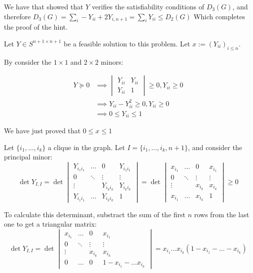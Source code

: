 \documentclass[11pt]{article}
\begin{document}
We have that showed that \(Y\) verifies the satisfiability conditions of \(D_3(G)\), and therefore \(D_3(G) = \sum_{i} -Y_{ii} + 2Y_{i,n+1} =\sum_{i} Y_{ii} \le D_2(G)\)
Which completes the proof of the hint.


Let \(Y \in S^{n+1 \times n+1}\) be a feasible solution to this problem. Let \(x := (Y_{ii})_{i \le n}\). 

By consider the \(1 \times 1\) and \(2 \times 2\) minors:

\begin{align*}
Y \succeq 0 
&\implies \begin{vmatrix}Y_{ii}&Y_{ii}\\Y_{ii}&1\end{vmatrix} \ge 0, Y_{ii} \ge 0
\\&\implies Y_{ii} - Y_{ii}^2 \ge 0, Y_{ii} \ge 0
\\&\implies 0 \le Y_{ii}  \le 1
\end{align*}

We have just proved that \(0 \le x \le 1\)

Let \(\{i_1, \ldots, i_k\}\) a clique in the graph. Let \(I = \{i_1, \ldots, i_k, n+1\}\), and consider the principal minor:
\[\det Y_{I, I} = \det \begin{vmatrix}
Y_{i_1i_1} &    \ldots    &    0        & Y_{i_1i_1}\\
    0       & \ddots &   \vdots         & \vdots\\
    \vdots       &        & Y_{i_ki_k} & Y_{i_ki_k}\\
  Y_{i_1i_1}  &   \ldots     &  Y_{i_ki_k} & 1
\end{vmatrix} =
\det \begin{vmatrix}
x_{i_1} &    \ldots    &    0        & x_{i_1}\\
    0       & \ddots &   \vdots         & \vdots\\
    \vdots       &        & x_{i_k} & x_{i_k}\\
  x_{i_1}  &   \ldots     &  x_{i_k} & 1
\end{vmatrix}
\ge 0\]

To calculate this determinant, substract the sum of the first \(n\) rows from the last one to get a triangular matrix:
\[\det Y_{I, I} = \det \begin{vmatrix}
x_{i_1} &    \ldots    &    0        & x_{i_1}\\
    0       & \ddots &   \vdots         & \vdots\\
    \vdots       &        & x_{i_k} & x_{i_k}\\
  0  &   \ldots     &  0 & 1 - x_{i_1} - \ldots x_{i_k}
\end{vmatrix} = x_{i_1} \ldots x_{i_k} (1 - x_{i_1} - \ldots -x_{i_k}) \]
\end{document}
